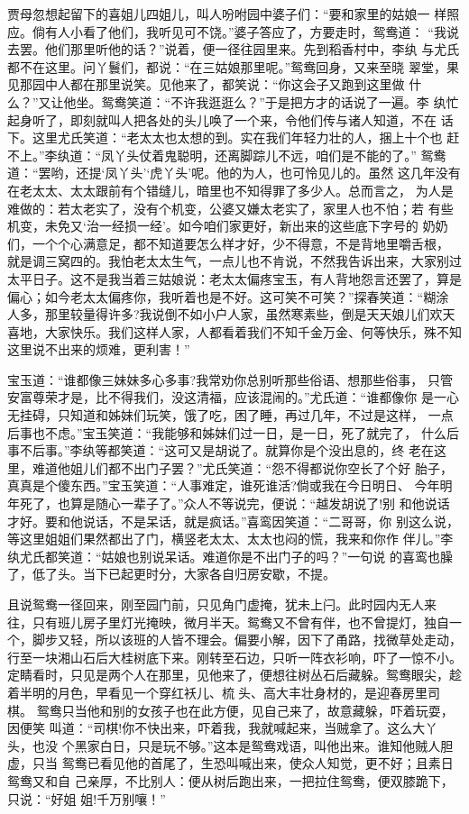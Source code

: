 贾母忽想起留下的喜姐儿四姐儿，叫人吩咐园中婆子们：“要和家里的姑娘一
样照应。倘有人小看了他们，我听见可不饶。”婆子答应了，方要走时，鸳鸯道：
“我说去罢。他们那里听他的话？”说着，便一径往园里来。先到稻香村中，李纨
与尤氏都不在这里。问丫鬟们，都说：“在三姑娘那里呢。”鸳鸯回身，又来至晓
翠堂，果见那园中人都在那里说笑。见他来了，都笑说：“你这会子又跑到这里做
什么？”又让他坐。鸳鸯笑道：“不许我逛逛么？”于是把方才的话说了一遍。李
纨忙起身听了，即刻就叫人把各处的头儿唤了一个来，令他们传与诸人知道，不在
话下。这里尤氏笑道：“老太太也太想的到。实在我们年轻力壮的人，捆上十个也
赶不上。”李纨道：“凤丫头仗着鬼聪明，还离脚踪儿不远，咱们是不能的了。”
鸳鸯道：“罢哟，还提‘凤丫头’‘虎丫头’呢。他的为人，也可怜见儿的。虽然
这几年没有在老太太、太太跟前有个错缝儿，暗里也不知得罪了多少人。总而言之，
为人是难做的：若太老实了，没有个机变，公婆又嫌太老实了，家里人也不怕；若
有些机变，未免又‘治一经损一经’。如今咱们家更好，新出来的这些底下字号的
奶奶们，一个个心满意足，都不知道要怎么样才好，少不得意，不是背地里嚼舌根，
就是调三窝四的。我怕老太太生气，一点儿也不肯说，不然我告诉出来，大家别过
太平日子。这不是我当着三姑娘说：老太太偏疼宝玉，有人背地怨言还罢了，算是
偏心；如今老太太偏疼你，我听着也是不好。这可笑不可笑？”探春笑道：“糊涂
人多，那里较量得许多?我说倒不如小户人家，虽然寒素些，倒是天天娘儿们欢天
喜地，大家快乐。我们这样人家，人都看着我们不知千金万金、何等快乐，殊不知
这里说不出来的烦难，更利害！”

宝玉道：“谁都像三妹妹多心多事?我常劝你总别听那些俗语、想那些俗事，
只管安富尊荣才是，比不得我们，没这清福，应该混闹的。”尤氏道：“谁都像你
是一心无挂碍，只知道和姊妹们玩笑，饿了吃，困了睡，再过几年，不过是这样，
一点后事也不虑。”宝玉笑道：“我能够和姊妹们过一日，是一日，死了就完了，
什么后事不后事。”李纨等都笑道：“这可又是胡说了。就算你是个没出息的，终
老在这里，难道他姐儿们都不出门子罢？”尤氏笑道：“怨不得都说你空长了个好
胎子，真真是个傻东西。”宝玉笑道：“人事难定，谁死谁活?倘或我在今日明日、
今年明年死了，也算是随心一辈子了。”众人不等说完，便说：“越发胡说了!别
和他说话才好。要和他说话，不是呆话，就是疯话。”喜鸾因笑道：“二哥哥，你
别这么说，等这里姐姐们果然都出了门，横竖老太太、太太也闷的慌，我来和你作
伴儿。”李纨尤氏都笑道：“姑娘也别说呆话。难道你是不出门子的吗？”一句说
的喜鸾也臊了，低了头。当下已起更时分，大家各自归房安歇，不提。

且说鸳鸯一径回来，刚至园门前，只见角门虚掩，犹未上闩。此时园内无人来
往，只有班儿房子里灯光掩映，微月半天。鸳鸯又不曾有伴，也不曾提灯，独自一
个，脚步又轻，所以该班的人皆不理会。偏要小解，因下了甬路，找微草处走动，
行至一块湘山石后大桂树底下来。刚转至石边，只听一阵衣衫响，吓了一惊不小。
定睛看时，只见是两个人在那里，见他来了，便想往树丛石后藏躲。鸳鸯眼尖，趁
着半明的月色，早看见一个穿红袄儿、梳头、高大丰壮身材的，是迎春房里司棋。
鸳鸯只当他和别的女孩子也在此方便，见自己来了，故意藏躲，吓着玩耍，因便笑
叫道：“司棋!你不快出来，吓着我，我就喊起来，当贼拿了。这么大丫头，也没
个黑家白日，只是玩不够。”这本是鸳鸯戏语，叫他出来。谁知他贼人胆虚，只当
鸳鸯已看见他的首尾了，生恐叫喊出来，使众人知觉，更不好；且素日鸳鸯又和自
己亲厚，不比别人：便从树后跑出来，一把拉住鸳鸯，便双膝跪下，只说：“好姐
姐!千万别嚷！”

